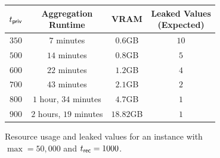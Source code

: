 \begin{figure}[h]
	\centering
	\begin{tabular}{ |c|c|c|c| }
		\hline
		$t_{\sf priv}$ & \makecell{Aggregation\\ Runtime} & VRAM      & \makecell{Leaked Values\\(Expected)} \\
		\hline
		$350$ & $7$ minutes                      & $0.6$GB   & $10$                                 \\
		\hline
		$500$ & $14$ minutes                     & $0.8$GB   & $5$                                  \\
		\hline
		$600$ & $22$ minutes                     & $1.2$GB   & $4$                                  \\
		\hline
		$700$ & $43$ minutes                     & $2.1$GB   & $2$                                  \\
		\hline
		$800$ & $1$ hour, $34$ minutes           & $4.7$GB   & $1$                                  \\
		\hline
		$900$ & $2$ hours, $19$ minutes          & $18.82$GB & $1$                                  \\
		\hline
	\end{tabular}
	\caption{Resource usage and leaked values for an instance with $\max = 50{,}000$ and $t_{\sf rec} = 1000$.}
	\label{fig:increasing-tpriv}
\end{figure}
